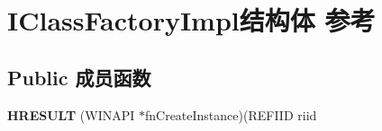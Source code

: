 \hypertarget{struct_i_class_factory_impl}{}\section{I\+Class\+Factory\+Impl结构体 参考}
\label{struct_i_class_factory_impl}
\subsection*{Public 成员函数}
\begin{DoxyCompactItemize}
\item 
\mbox{\label{struct_i_class_factory_impl_a4eb2aba98f21061660ef4a34b9acb9f4}} 
{\bfseries H\+R\+E\+S\+U\+LT} (W\+I\+N\+A\+PI $\ast$fn\+Create\+Instance)(R\+E\+F\+I\+ID riid
\end{DoxyCompactItemize}
